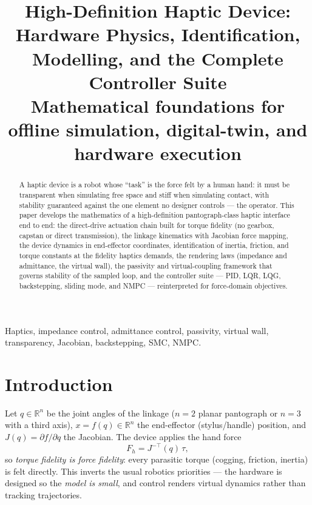 \documentclass[conference]{IEEEtran}
\begin{document}
\title{High-Definition Haptic Device:\\ Hardware Physics, Identification, Modelling, and the Complete Controller Suite\\
{\footnotesize Mathematical foundations for offline simulation, digital-twin, and hardware execution}}

\author{
}

\maketitle

\begin{abstract}
A haptic device is a robot whose ``task'' is the force felt by a human hand: it must be transparent when simulating free space and stiff when simulating contact, with stability guaranteed against the one element no designer controls --- the operator. This paper develops the mathematics of a high-definition pantograph-class haptic interface end to end: the direct-drive actuation chain built for torque fidelity (no gearbox, capstan or direct transmission), the linkage kinematics with Jacobian force mapping, the device dynamics in end-effector coordinates, identification of inertia, friction, and torque constants at the fidelity haptics demands, the rendering laws (impedance and admittance, the virtual wall), the passivity and virtual-coupling framework that governs stability of the sampled loop, and the controller suite --- PID, LQR, LQG, backstepping, sliding mode, and NMPC --- reinterpreted for force-domain objectives.
\end{abstract}

\begin{IEEEkeywords}
Haptics, impedance control, admittance control, passivity, virtual wall, transparency, Jacobian, backstepping, SMC, NMPC.
\end{IEEEkeywords}

\section{Introduction}
Let $q\in\mathbb R^n$ be the joint angles of the linkage ($n = 2$ planar pantograph or $n=3$ with a third axis), $x = f(q)\in\mathbb R^n$ the end-effector (stylus/handle) position, and $J(q) = \partial f/\partial q$ the Jacobian. The device applies the hand force
\begin{equation}
F_h = J^{-\!\top}(q)\,\tau,
\label{eq:forcemap}
\end{equation}
so \emph{torque fidelity is force fidelity}: every parasitic torque (cogging, friction, inertia) is felt directly. This inverts the usual robotics priorities --- the hardware is designed so the \emph{model is small}, and control renders virtual dynamics rather than tracking trajectories.
\end{document}
